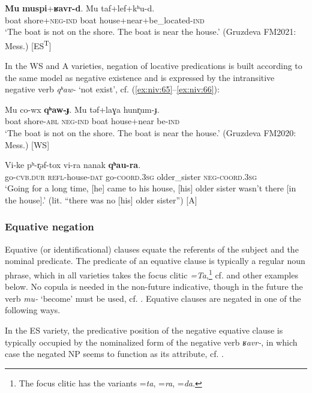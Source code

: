 \documentclass[output=paper,colorlinks,citecolor=brown]{langscibook}
\begin{document}
\ea\label{ex:niv:64}
    \gll \textbf{Mu} \textbf{muspi}+\textbf{ʁavr-d}. Mu taf+lef+kʰu-d. \\ 
         boat shore+\textsc{neg-ind} boat house+near+be\_located{}-\textsc{ind} \\
    \glt ‘The boat is not on the shore. The boat is near the house.’ (Gruzdeva FM2021: Mess.) [ES\textsuperscript{T}]
\z 

In the WS and A varieties, negation of locative predications is built according to the same model as negative existence and is expressed by the intransitive negative verb \textit{qʰaw-} ‘not exist’, cf. (\ref{ex:niv:65}--\ref{ex:niv:66}):


\ea\label{ex:niv:65}
    \gll  Mu co-wx \textbf{qʰaw-ɟ}. Mu təf+laɣa hunr̥um-ɟ.\\ 
         boat shore-\textsc{abl} \textsc{neg-ind} boat house+near be-\textsc{ind} \\
    \glt ‘The boat is not on the shore. The boat is near the house.’ (Gruzdeva FM2020: Mess.) [WS]
\z 


\ea\label{ex:niv:66}
    \gll Vi-ke pʰ-r̥əf-tox vi-ra nanak \textbf{qʰau-ra}. \\ 
         go-\textsc{cvb.dur} \textsc{refl}{}-house-\textsc{dat} go-\textsc{coord.3sg} older\_sister \textsc{neg-coord.3sg} \\
    \glt ‘Going for a long time, [he] came to his house, [his] older sister wasn’t there [in the house].’ (lit. “there was no [his] older sister”) \citep[225]{Panfilov1965} [A]
\z 

\subsubsection{Equative negation}\label{sec:niv:2.3.4} 

Equative (or identificational) clauses equate the referents of the subject and the nominal predicate. The predicate of an equative clause is typically a regular noun phrase, which in all varieties takes the focus clitic \textit{=Ta},\footnote{The focus clitic has the variants =\textit{ta}, =\textit{ra}, =\textit{da}.} cf.  and other examples below. No copula is needed in the non-future indicative, though in the future the verb \textit{mu-} ‘become’ must be used, cf. . Equative clauses are negated in one of the following ways.

In the ES variety, the predicative position of the negative equative clause is typically occupied by the nominalized form of the negative verb \textit{ʁavr-}, in which case the negated NP seems to function as its attribute, cf. .
\end{document}

